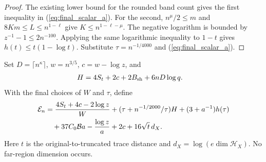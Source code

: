 \begin{proof}
    \leanok
    The existing lower bound for the rounded band count gives the
    first inequality in (\ref{eq:final_scalar_a}). For the second,
    $n^\mu/2\leq m$ and $8Km\leq L\leq n^{1-\ell}$ give
    $K\leq n^{1-\ell-\mu}$. The negative logarithm is bounded by
    $z^{-1}-1\leq2n^{-100}$. Applying the same logarithmic inequality
    to $1-t$ gives $h(t)\leq t(1-\log t)$. Substitute
    $\tau=n^{-1/4000}$ and (\ref{eq:final_scalar_a}).
\end{proof}

\begin{definition}
    \label{def:arealaw-final-sharp-error}
    \leanok
    Set $D=\lceil n^\kappa\rceil$, $w=n^{3/5}$,
    $c=w-\log z$, and
    \begin{align}
        H & =4S_t+2c+2B_{\rm sh}+6nD\log q.
        \label{eq:final_scalar_H}
    \end{align}
    With the final choices of $W$ and $\tau$, define
    \begin{align}
        \mathcal E_n
         & =\frac{4S_t+4c-2\log z}{W}
        +(\tau+n^{-1/2000}/\tau)H
        +(3+a^{-1})h(\tau) \notag     \\
         & \quad+37C_0\mathcal B a
        -\frac{\log z}{a}+2c+16\sqrt t\,d_X.
        \label{eq:final_scalar_error}
    \end{align}
    Here $t$ is the original-to-truncated trace distance and
    $d_X=\log(e\dim\mathcal H_X)$. No far-region dimension occurs.
\end{definition}

